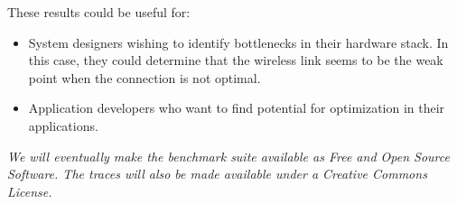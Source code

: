 \documentclass[portrait, a1]{KTHEEposter}
\begin{document}
\begin{pcolumns}[3]
\begin{pcolumn}[3]
\begin{pframe}[2.14]
                 These results could be useful for:
                 \begin{itemize}
                     \item System designers wishing to identify bottlenecks in their hardware stack.
                     In this case, they could determine that the wireless link seems to be the weak point when the connection is not optimal.
                     \item Application developers who want to find potential for optimization in their applications.
                 \end{itemize}
            \end{pframe}
            \begin{pframe}[.17]
                \medskip\itshape\footnotesize
                We will eventually make the benchmark suite available as Free and Open Source Software.
                The traces will also be made available under a Creative Commons License.
            \end{pframe}    
            \begin{pframe**}[.69]
                \nocite{*}
                \small
                \printbibliography
            \end{pframe**}
        \end{pcolumn}
    \end{pcolumns}
    
\end{document}
